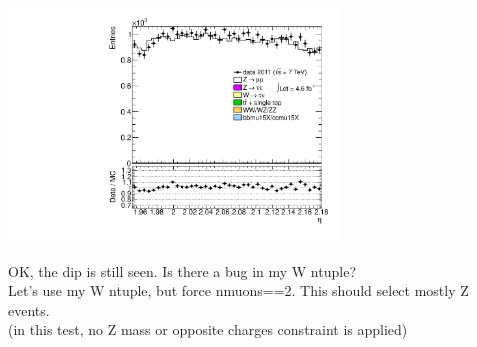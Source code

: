 {\includegraphics[width=0.66\textwidth]{dates/20130306/figures/both/Z_10_A_stack_lN_eta_ALL.pdf} 
\cole
}

 {
OK, the dip is still seen. Is there a bug in my W ntuple? \\
Let's use my W ntuple, but force nmuons==2. This should select mostly Z events. \\
(in this test, no Z mass or opposite charges constraint is applied)
}
